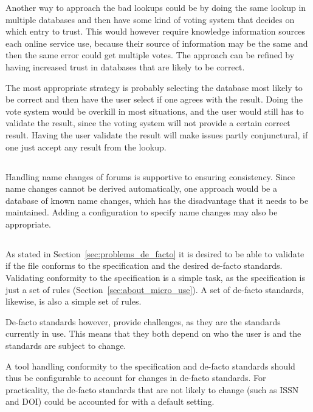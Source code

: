 Another way to approach the bad lookups could be by doing the same
lookup in multiple databases and then have some kind of voting system
that decides on which entry to trust.  This would however require
knowledge information sources each online service use, because their
source of information may be the same and then the same error could
get multiple votes.  The approach can be refined by having increased
trust in databases that are likely to be correct.

The most appropriate strategy is probably selecting the database most
likely to be correct and then have the user select if one agrees with
the result.  Doing the vote system would be overkill in most
situations, and the user would still has to validate the result, since
the voting system will not provide a certain correct result.  Having
the user validate the result will make issues partly conjunctural, if
one just accept any result from the lookup.


\subsection{}

Handling name changes of forums is supportive to ensuring consistency.
Since name changes cannot be derived automatically, one approach would
be a database of known name changes, which has the disadvantage that
it needs to be maintained.  Adding a configuration to specify name
changes may also be appropriate.


\subsection{}

As stated in Section~\ref{sec:problems_de_facto} it is desired to be
able to validate if the file conforms to the specification and the
desired de-facto standards.  Validating conformity to the
specification is a simple task, as the specification is just a set of
rules (Section~\ref{sec:about_micro_use}).  A set of de-facto
standards, likewise, is also a simple set of rules.

De-facto standards however, provide challenges, as they are the
standards currently in use.  This means that they both depend on who
the user is and the standards are subject to change.

A tool handling conformity to the specification and de-facto standards
should thus be configurable to account for changes in de-facto
standards.  For practicality, the de-facto standards that are not
likely to change (such as ISSN and DOI) could be accounted for with a
default setting.

